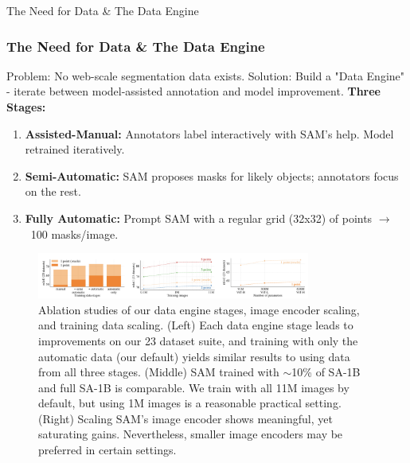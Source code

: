 \documentclass{beamer}
\begin{document}
\begin{frame}{The Need for Data \& The Data Engine}
    \frametitle{The Need for Data \& The Data Engine}
    Problem: No web-scale segmentation data exists.
    Solution: Build a "Data Engine" - iterate between model-assisted annotation and model improvement.
    \textbf{Three Stages:}
    \begin{enumerate}
        \item \textbf{Assisted-Manual:} Annotators label interactively with SAM's help. Model retrained iteratively.
        \item \textbf{Semi-Automatic:} SAM proposes masks for likely objects; annotators focus on the rest.
        \item \textbf{Fully Automatic:} Prompt SAM with a regular grid (32x32) of points $\rightarrow$ ~100 masks/image.
    \end{enumerate}
    \vfill
    \begin{figure}
        \centering
        \includegraphics[width=0.8\textwidth]{figures/data_engine_ablation.png}
        \caption{\tiny Ablation studies of our data engine stages, image encoder scaling, and training data scaling. (Left) Each data
        engine stage leads to improvements on our 23 dataset suite, and training with only the automatic data (our default) yields
        similar results to using data from all three stages. (Middle) SAM trained with $\sim$10\% of SA-1B and full SA-1B is comparable.
        We train with all 11M images by default, but using 1M images is a reasonable practical setting. (Right) Scaling SAM's image
        encoder shows meaningful, yet saturating gains. Nevertheless, smaller image encoders may be preferred in certain settings.}
        \label{fig:data_engine}
    \end{figure}
\end{frame}
\end{document}
